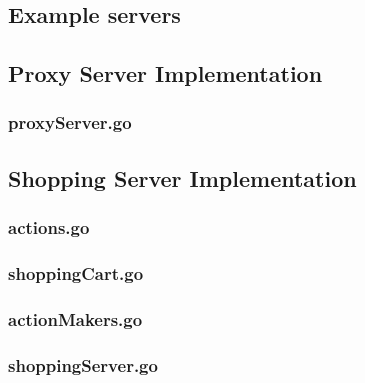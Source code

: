 \begin{appendices}
\section{Example servers}

\subsection{Proxy Server Implementation}
\subsubsection{proxyServer.go}


\newpage
\subsection{Shopping Server Implementation}
\subsubsection{actions.go}

\subsubsection{shoppingCart.go}

\subsubsection{actionMakers.go}

\newpage
\subsubsection{shoppingServer.go}

\end{appendices}